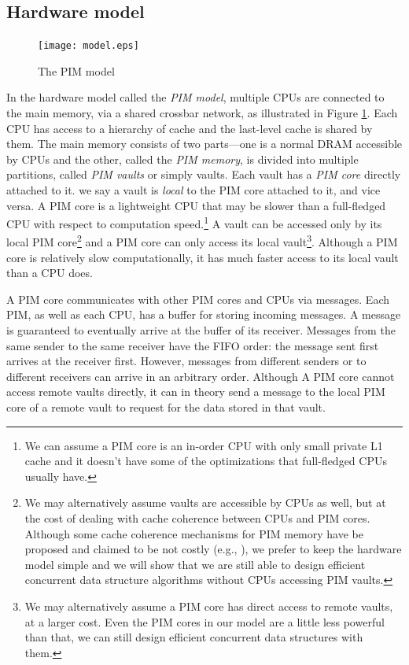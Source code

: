 \documentclass[11pt]{article}
\begin{document}
\subsection{Hardware model}
\label{section:hardware_model}

\begin{figure}[ht!]
\centering
\texttt{[image: model.eps]}
\caption{The PIM model}
\label{figure:model}
\end{figure}


In the hardware model called the \emph{PIM model}, multiple CPUs are connected to the main
memory, via a shared crossbar network, as illustrated in Figure \ref{figure:model}.
Each CPU has access to a hierarchy of cache and
the last-level cache is shared by them. 
The main memory consists of two parts---one is a normal DRAM accessible by CPUs 
and the other, called the \emph{PIM memory}, is divided into multiple partitions, 
called \emph{PIM vaults} or simply vaults.  
Each vault has a \emph{PIM core} directly attached to it.
we say a vault is \emph{local} to the PIM core attached to it, and vice versa.
A PIM core is a lightweight CPU that may be slower than a full-fledged CPU
with respect to computation speed.\footnote{
We can assume a PIM core is an in-order CPU with only small private L1 cache and 
it doesn't have some of the optimizations that full-fledged CPUs usually have.}
A vault can be accessed only by its local PIM core\footnote{
We may alternatively assume vaults are accessible by CPUs as well, 
but at the cost of dealing with cache coherence between CPUs and PIM cores. 
Although some cache coherence mechanisms for PIM memory have be proposed 
and claimed to be not costly (e.g., \cite{boroumand2016}), 
we prefer to keep the hardware model simple and we will show that we are still able to 
design efficient concurrent data structure algorithms without CPUs accessing PIM vaults. }
and a PIM core can only access its local vault\footnote{
We may alternatively assume a PIM core has direct access to remote vaults,
at a larger cost. Even the PIM cores in our model are a little less powerful than that,
we can still design efficient concurrent data structures with them.}.
Although a PIM core is relatively slow computationally,
it has much faster access to its local vault than a CPU does.

A PIM core communicates with other PIM cores and CPUs via messages.
Each PIM, as well as each CPU, has a buffer for storing incoming messages.
A message is guaranteed to eventually arrive at the buffer of its receiver.
Messages from the same sender to the same receiver have the FIFO order: 
the message sent first arrives at the receiver first. 
However, messages from different senders or to different receivers can arrive in an arbitrary order. 
Although A PIM core cannot access remote vaults directly, it can in theory send a message
to the local PIM core of a remote vault to request for the data stored in that vault.
\end{document}
